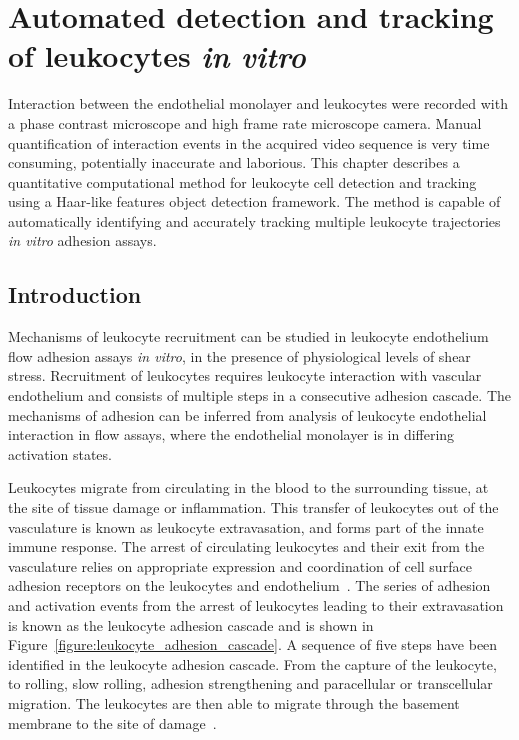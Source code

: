 \chapter{Automated detection and tracking of leukocytes \emph{in vitro}}
\label{chapter:leukocytes}
\ifpdf
    \graphicspath{{chapter_4/figs/}}
\fi

\nomenclature[g-pi]{$\pi$}{ $\simeq 3.14\ldots$}

Interaction between the endothelial monolayer and leukocytes were recorded with a phase contrast microscope and high frame rate microscope camera. Manual quantification of interaction events in the acquired video sequence is very time consuming, potentially inaccurate and laborious. This chapter describes a quantitative computational method for leukocyte cell detection and tracking using a Haar-like features object detection framework. The method is capable of automatically identifying and accurately tracking multiple leukocyte trajectories \emph{in vitro} adhesion assays.

\section{Introduction}
\label{leukocytes:introduction}
Mechanisms of leukocyte recruitment can be studied in leukocyte endothelium flow adhesion assays \emph{in vitro}, in the presence of physiological levels of shear stress. Recruitment of leukocytes requires leukocyte interaction with vascular endothelium and consists of multiple steps in a consecutive adhesion cascade. The mechanisms of adhesion can be inferred from analysis of leukocyte endothelial interaction in flow assays, where the endothelial monolayer is in differing activation states.

Leukocytes migrate from circulating in the blood to the surrounding tissue, at the site of tissue damage or inflammation. This transfer of leukocytes out of the vasculature is known as leukocyte extravasation, and forms part of the innate immune response. The arrest of circulating leukocytes and their exit from the vasculature relies on appropriate expression and coordination of cell surface adhesion receptors on the leukocytes and endothelium~\cite{Mayadas1993}. The series of adhesion and activation events from the arrest of leukocytes leading to their extravasation is known as the leukocyte adhesion cascade and is shown in Figure~\ref{figure:leukocyte_adhesion_cascade}. A sequence of five steps have been identified in the leukocyte adhesion cascade. From the capture of the leukocyte, to rolling, slow rolling, adhesion strengthening and paracellular or transcellular migration. The leukocytes are then able to migrate through the basement membrane to the site of damage~\cite{Ley2007}.

